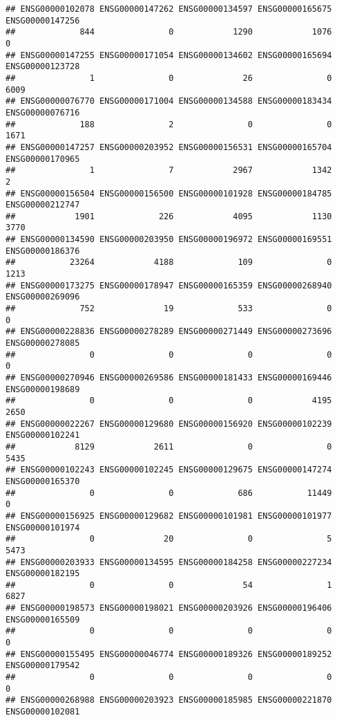 \documentclass[
]{article}
\begin{document}
\begin{verbatim}
## ENSG00000102078 ENSG00000147262 ENSG00000134597 ENSG00000165675 ENSG00000147256 
##             844               0            1290            1076               0 
## ENSG00000147255 ENSG00000171054 ENSG00000134602 ENSG00000165694 ENSG00000123728 
##               1               0              26               0            6009 
## ENSG00000076770 ENSG00000171004 ENSG00000134588 ENSG00000183434 ENSG00000076716 
##             188               2               0               0            1671 
## ENSG00000147257 ENSG00000203952 ENSG00000156531 ENSG00000165704 ENSG00000170965 
##               1               7            2967            1342               2 
## ENSG00000156504 ENSG00000156500 ENSG00000101928 ENSG00000184785 ENSG00000212747 
##            1901             226            4095            1130            3770 
## ENSG00000134590 ENSG00000203950 ENSG00000196972 ENSG00000169551 ENSG00000186376 
##           23264            4188             109               0            1213 
## ENSG00000173275 ENSG00000178947 ENSG00000165359 ENSG00000268940 ENSG00000269096 
##             752              19             533               0               0 
## ENSG00000228836 ENSG00000278289 ENSG00000271449 ENSG00000273696 ENSG00000278085 
##               0               0               0               0               0 
## ENSG00000270946 ENSG00000269586 ENSG00000181433 ENSG00000169446 ENSG00000198689 
##               0               0               0            4195            2650 
## ENSG00000022267 ENSG00000129680 ENSG00000156920 ENSG00000102239 ENSG00000102241 
##            8129            2611               0               0            5435 
## ENSG00000102243 ENSG00000102245 ENSG00000129675 ENSG00000147274 ENSG00000165370 
##               0               0             686           11449               0 
## ENSG00000156925 ENSG00000129682 ENSG00000101981 ENSG00000101977 ENSG00000101974 
##               0              20               0               5            5473 
## ENSG00000203933 ENSG00000134595 ENSG00000184258 ENSG00000227234 ENSG00000182195 
##               0               0              54               1            6827 
## ENSG00000198573 ENSG00000198021 ENSG00000203926 ENSG00000196406 ENSG00000165509 
##               0               0               0               0               0 
## ENSG00000155495 ENSG00000046774 ENSG00000189326 ENSG00000189252 ENSG00000179542 
##               0               0               0               0               0 
## ENSG00000268988 ENSG00000203923 ENSG00000185985 ENSG00000221870 ENSG00000102081 

\end{verbatim}
\end{document}
